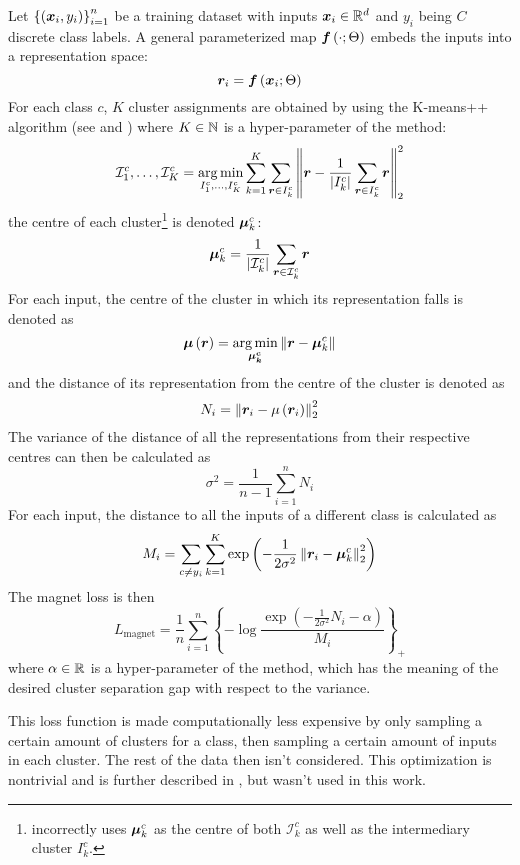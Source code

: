Let \( \left\{ \left( \bm{x}_i, y_i \right) \right\}_{i = 1}^n \) be a training dataset with inputs \( \bm{x}_i \in \mathbb{R}^d \) and \( y_i \) being \( C \) discrete class labels. A general parameterized map \( \bm{f} \left( \cdot; \Theta \right) \) embeds the inputs into a representation space:
\[ \bm{r}_i = \bm{f} \left( \bm{x}_i; \Theta \right) \]
For each class \( c \), \( K \) cluster assignments are obtained by using the K-means++ algorithm (see \cite{macqueen_methods_1967} and \cite{arthur_k-means++:_2007}) where \( K \in \mathbb{N} \) is a hyper-parameter of the method:
\[ \mathcal{I}_1^c, \dots, \mathcal{I}_K^c = \operatorname*{arg\,min}_{I_1^c, \dots, I_K^c} \sum_{k = 1}^K \sum_{\bm{r} \in I_k^c} \left\lVert \bm{r} - \frac{1}{\left\lvert I_k^c \right\rvert} \sum_{\bm{r} \in I_k^c} \bm{r} \right\rVert_2^2  \]
the centre of each cluster\footnote{\cite{rippel_metric_2015} incorrectly uses \( \bm{\mu}_k^c \) as the centre of both \( \mathcal{I}_k^c \) as well as the intermediary cluster \( I_k^c \).} is denoted \( \bm{\mu}_k^c \):
\[ \bm{\mu}_k^c = \frac{1}{\left\lvert \mathcal{I}_k^c \right\rvert} \sum_{\bm{r} \in \mathcal{I}_k^c} \bm{r} \]
For each input, the centre of the cluster in which its representation falls is denoted as
\[ \bm{\mu} \left( \bm{r} \right) = \operatorname*{arg\,min}_{\bm{\mu_k^c}} \left\lVert \bm{r} - \bm{\mu}_k^c \right\rVert \]
and the distance of its representation from the centre of the cluster is denoted as
\[ N_i = \left\lVert \bm{r}_i - \mu \left( \bm{r}_i \right) \right\rVert_2^2 \]
The variance of the distance of all the representations from their respective centres can then be calculated as
\[ \sigma^2 = \frac{1}{n - 1} \sum_{i = 1}^n N_i \]
For each input, the distance to all the inputs of a different class is calculated as
\[ M_i = \sum_{c \neq y_i} \sum_{k = 1}^K \exp \left( - \frac{1}{2 \sigma^2} \left\lVert \bm{r}_i - \bm{\mu}_k^c \right\rVert_2^2 \right) \]
The magnet loss is then
\[ L_\mathrm{magnet} = \frac{1}{n} \sum_{i = 1}^n \left\{ - \log \frac{\exp \left( - \frac{1}{2 \sigma^2} N_i - \alpha \right)}{M_i} \right\}_+ \]
where \( \alpha \in \mathbb{R} \) is a hyper-parameter of the method, which has the meaning of the desired cluster separation gap with respect to the variance.

This loss function is made computationally less expensive by only sampling a certain amount of clusters for a class, then sampling a certain amount of inputs in each cluster. The rest of the data then isn't considered. This optimization is nontrivial and is further described in \cite{rippel_metric_2015}, but wasn't used in this work.

